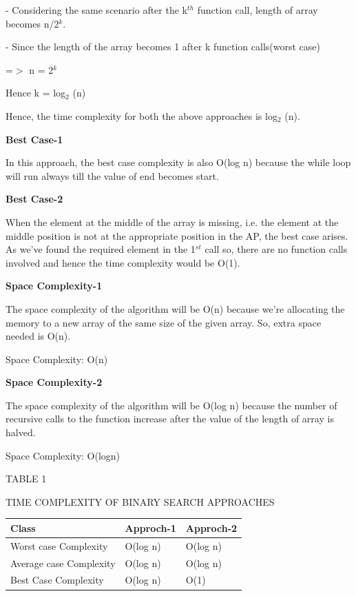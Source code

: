 \documentclass[12pt,a4paper]{article}
\begin{document}
\begin{multicols}{2}
-  Considering the same scenario after the k$^{th}$ function call, length of array becomes n/2$^{k}$.

-  Since the length of the array becomes 1 after k function calls(worst case) 

=$>$ n = 2$^{k}$

Hence k = log$_{2}$ (n)



Hence, the time complexity for both the above approaches is log$_{2}$
(n).

\textbf{Best Case-1 }

In this approach, the best case complexity is also O(log n) because the while loop will run always till the value of end becomes start.


\textbf{Best Case-2 }

When the element at the middle of the array is missing, i.e. the element at the middle position is not at the appropriate position in the AP, the best case arises. As we've found the required element in the 1$^{st}$ call so, there are no function calls involved and hence the time complexity would be O(1).

\textbf{Space Complexity-1 }

The space complexity of the algorithm will be O(n) because we're allocating the memory to a new array of the same size of the given array. So, extra space needed is O(n).

Space Complexity: O(n)

\textbf{Space Complexity-2 }

The space complexity of the algorithm will be O(log n) because the number of recursive calls to the function increase after the value of the length of array is halved.

Space Complexity: O(logn)





\end{multicols}
\begin{center}TABLE 1\end{center}

\begin{center}TIME COMPLEXITY OF  BINARY SEARCH APPROACHES \end{center}

\begin{table}[h]
\centering
\begin{tabular}{|l|l|l|}
\hline
\textbf{Class} & \textbf{Approch-1} & \textbf{Approch-2} \\
\hline
Worst case Complexity & O(log n) & O(log n) \\
\hline
Average case Complexity & O(log n) & O(log n) \\
\hline
Best Case Complexity & O(log n) & O(1) \\
\hline
\end{tabular}
\end{table}
\end{document}
